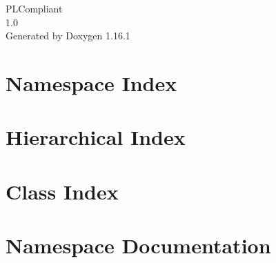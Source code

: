 \documentclass[twoside]{book}
\newcommand{\+}{\discretionary{\mbox{\scriptsize$\hookleftarrow$}}{}{}}
\newcommand{\clearemptydoublepage}{%
    \newpage{\pagestyle{empty}\cleardoublepage}%
  }
\begin{document}
  \raggedbottom
    \hypersetup{pageanchor=false,
                bookmarksnumbered=true,
                pdfencoding=unicode
               }
  \begin{titlepage}
  \vspace*{7cm}
  \begin{center}%
  {\Large PLCompliant}\\
  [1ex]\large 1.\+0 \\
  \vspace*{1cm}
  {\large Generated by Doxygen 1.16.1}\\
  \end{center}
  \end{titlepage}
  \clearemptydoublepage
  \tableofcontents
  \clearemptydoublepage
  \hypersetup{pageanchor=true}

\chapter{Namespace Index}

\chapter{Hierarchical Index}

\chapter{Class Index}

\chapter{Namespace Documentation}


















\end{document}
